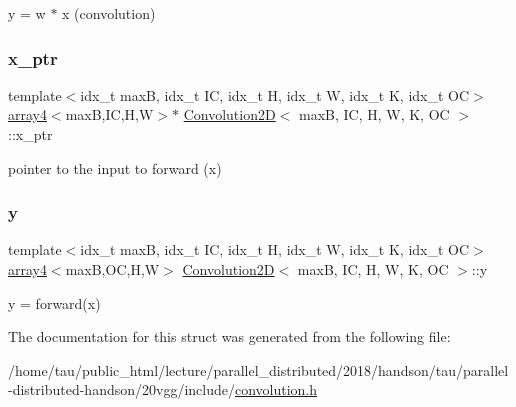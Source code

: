 y = w $\ast$ x (convolution) \mbox{\label{structConvolution2D_a404b6e9b9a932e463f237d5bd35b2154}} 
\subsubsection{\texorpdfstring{x\+\_\+ptr}{x\_ptr}}
{\footnotesize\ttfamily template$<$idx\+\_\+t maxB, idx\+\_\+t IC, idx\+\_\+t H, idx\+\_\+t W, idx\+\_\+t K, idx\+\_\+t OC$>$ \\
\hyperlink{structarray4}{array4}$<$maxB,IC,H,W$>$$\ast$ \hyperlink{structConvolution2D}{Convolution2D}$<$ maxB, IC, H, W, K, OC $>$\+::x\+\_\+ptr}

pointer to the input to forward (x) \mbox{\label{structConvolution2D_ae321933a802088a32112cdbd16b16c0f}} 
\subsubsection{\texorpdfstring{y}{y}}
{\footnotesize\ttfamily template$<$idx\+\_\+t maxB, idx\+\_\+t IC, idx\+\_\+t H, idx\+\_\+t W, idx\+\_\+t K, idx\+\_\+t OC$>$ \\
\hyperlink{structarray4}{array4}$<$maxB,OC,H,W$>$ \hyperlink{structConvolution2D}{Convolution2D}$<$ maxB, IC, H, W, K, OC $>$\+::y}

y = forward(x) 

The documentation for this struct was generated from the following file\+:\begin{DoxyCompactItemize}
\item 
/home/tau/public\+\_\+html/lecture/parallel\+\_\+distributed/2018/handson/tau/parallel-\/distributed-\/handson/20vgg/include/\hyperlink{convolution_8h}{convolution.\+h}\end{DoxyCompactItemize}
